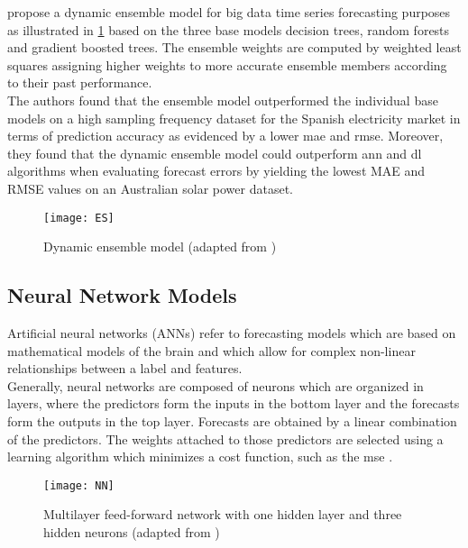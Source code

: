 \textcite{galicia2019} propose a dynamic ensemble model for big data time series forecasting purposes as illustrated in \cref{fig: Dynamic ensemble model} based on the three base models decision trees, random forests and gradient boosted trees. The ensemble weights are computed by weighted least squares assigning higher weights to more accurate ensemble members according to their past performance.\\
 
\noindent The authors found that the ensemble model outperformed the individual base models on a high sampling frequency dataset for the Spanish electricity market in terms of prediction accuracy as evidenced by a lower \acrfull{mae} and \acrfull{rmse}. Moreover, they found that the dynamic ensemble model could outperform \acrfull{ann} and \acrfull{dl} algorithms when evaluating forecast errors by yielding the lowest MAE and RMSE values on an Australian solar power dataset.

\begin{figure} [h]
\centering
\texttt{[image: ES]}
\caption{Dynamic ensemble model (adapted from \textcite{galicia2019})}
\label{fig: Dynamic ensemble model}
\end{figure}

\subsection{Neural Network Models}

Artificial neural networks (ANNs) refer to forecasting models which are based on mathematical models of the brain and which allow for complex non-linear relationships between a label and features.\\

\noindent Generally, neural networks are composed of neurons which are organized in layers, where the predictors form the inputs in the bottom layer and the forecasts form the outputs in the top layer. Forecasts are obtained by a linear combination of the predictors. The weights attached to those predictors are selected using a learning algorithm which minimizes a cost function, such as the \acrfull{mse} \parencite{hyndman2018}.

\begin{figure} [h]
\centering
\texttt{[image: NN]}
\caption{Multilayer feed-forward network with one hidden layer and three hidden neurons (adapted from \textcite{hyndman2018})}
\label{fig: Multilayer NN}
\end{figure}

